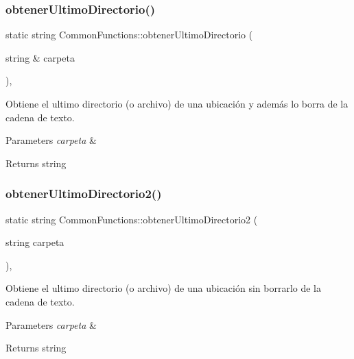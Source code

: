 \subsubsection{\texorpdfstring{obtener\+Ultimo\+Directorio()}{obtenerUltimoDirectorio()}}
{\footnotesize\ttfamily static string Common\+Functions\+::obtener\+Ultimo\+Directorio (\begin{DoxyParamCaption}\item[{string \&}]{carpeta }\end{DoxyParamCaption})\hspace{0.3cm}{\ttfamily [inline]}, {\ttfamily [static]}}



Obtiene el ultimo directorio (o archivo) de una ubicación y además lo borra de la cadena de texto. 


\begin{DoxyParams}{Parameters}
{\em carpeta} & \\
\hline
\end{DoxyParams}
\begin{DoxyReturn}{Returns}
string 
\end{DoxyReturn}
\mbox{\label{classCommonFunctions_af27fbe7fc5de24747ddf5a0496016301}} 
\subsubsection{\texorpdfstring{obtener\+Ultimo\+Directorio2()}{obtenerUltimoDirectorio2()}}
{\footnotesize\ttfamily static string Common\+Functions\+::obtener\+Ultimo\+Directorio2 (\begin{DoxyParamCaption}\item[{string}]{carpeta }\end{DoxyParamCaption})\hspace{0.3cm}{\ttfamily [inline]}, {\ttfamily [static]}}



Obtiene el ultimo directorio (o archivo) de una ubicación sin borrarlo de la cadena de texto. 


\begin{DoxyParams}{Parameters}
{\em carpeta} & \\
\hline
\end{DoxyParams}
\begin{DoxyReturn}{Returns}
string 
\end{DoxyReturn}
\mbox{\label{classCommonFunctions_aaa36dbe5e5b5be0caf0af58306f333bf}} 
